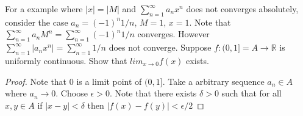 \documentclass[12pt]{article}
\makeatletter
\theoremstyle{homework}
\newenvironment{exercise}[1]
{\def\@currentlabel{#1}\exercisecore}
{\endexercisecore}
\makeatother
\begin{document}
For a example where $|x| = |M|$ and $\sum^\infty_{n=1} a_nx^n$ does not converges absolutely, consider the case $a_n=(-1)^n1/n$, $M=1$, $x=1$.  Note that $\sum^\infty_{n=1} a_nM^n=\sum^\infty_{n=1} (-1)^n1/n$ converges.  However $\sum^\infty_{n=1} |a_nx^n|=\sum^\infty_{n=1} 1/n$ does not converge.
\begin{exercise} 3
Suppose $f : (0,1]=A \rightarrow\mathbb{R}$ is uniformly continuous. Show that $lim_{x\rightarrow 0} f (x)$ exists.
\end{exercise}
\begin{proof}
Note that 0 is a limit point of $(0,1]$.  Take a arbitrary sequence $a_n\in A$ where $a_n\rightarrow 0$.  Choose $\epsilon>0$.  Note that there exists $\delta>0$ such that for all $x,y\in A$ if $|x-y|<\delta$ then $|f(x)-f(y)|<\epsilon/2$
\end{proof}
\end{document}
